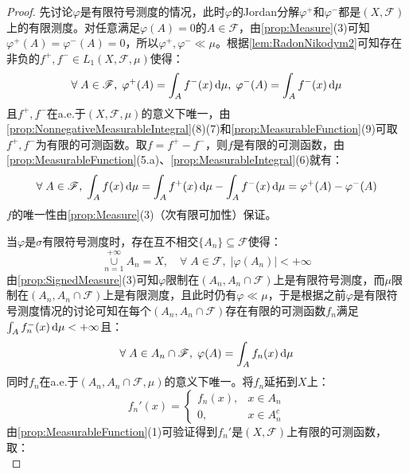 \begin{proof}
	先讨论$\varphi$是有限符号测度的情况，此时$\varphi$的Jordan分解$\varphi^+$和$\varphi^-$都是$(X,\mathscr{F})$上的有限测度。对任意满足$\varphi(A)=0$的$A\in\mathscr{F}$，由\cref{prop:Measure}(3)可知$\varphi^+(A)=\varphi^-(A)=0$，所以$\varphi^+,\varphi^-\ll\mu$。根据\cref{lem:RadonNikodym2}可知存在非负的$f^+,f^-\in L_1(X,\mathscr{F},\mu)$使得：
	\begin{equation*}
		\forall\;A\in\mathscr{F},\;\varphi^+(A)=\int_{A}f^-(x)\mathop{}\!\mathrm{d}\mu,\;\varphi^-(A)=\int_{A}f^-(x)\mathop{}\!\mathrm{d}\mu
	\end{equation*}
	且$f^+,f^-$在a.e.于$(X,\mathscr{F},\mu)$的意义下唯一，由\cref{prop:NonnegativeMeasurableIntegral}(8)(7)和\cref{prop:MeasurableFunction}(9)可取$f^+,f^-$为有限的可测函数。取$f=f^+-f^-$，则$f$是有限的可测函数，由\cref{prop:MeasurableFunction}(5.a)、\cref{prop:MeasurableIntegral}(6)就有：
	\begin{equation*}
		\forall\;A\in\mathscr{F},\;\int_{A}f(x)\mathop{}\!\mathrm{d}\mu=\int_{A}f^+(x)\mathop{}\!\mathrm{d}\mu-\int_{A}f^-(x)\mathop{}\!\mathrm{d}\mu=\varphi^+(A)-\varphi^-(A)
	\end{equation*}
	$f$的唯一性由\cref{prop:Measure}(3)（次有限可加性）保证。\par
	当$\varphi$是$\sigma$有限符号测度时，存在互不相交$\{A_n\}\subseteq\mathscr{F}$使得：
	\begin{equation*}
		\underset{n=1}{\overset{+\infty}{\cup}}A_n=X,\quad\forall\;A\in\mathscr{F},\;|\varphi(A_n)|<+\infty
	\end{equation*}
	由\cref{prop:SignedMeasure}(3)可知$\varphi$限制在$(A_n,A_n\cap\mathscr{F})$上是有限符号测度，而$\mu$限制在$(A_n,A_n\cap\mathscr{F})$上是有限测度，且此时仍有$\varphi\ll\mu$，于是根据之前$\varphi$是有限符号测度情况的讨论可知在每个$(A_n,A_n\cap\mathscr{F})$存在有限的可测函数$f_n$满足$\int_{A}f_n^-(x)\mathop{}\!\mathrm{d}\mu<+\infty$且：
	\begin{equation*}
		\forall\;A\in A_n\cap\mathscr{F},\;\varphi(A)=\int_{A}f_n(x)\mathop{}\!\mathrm{d}\mu
	\end{equation*}
	同时$f_n$在a.e.于$(A_n,A_n\cap\mathscr{F},\mu)$的意义下唯一。将$f_n$延拓到$X$上：
	\begin{equation*}
		f_n'(x)=
		\begin{cases}
			f_n(x),&x\in A_n \\
			0,&x\in A_n^c
		\end{cases}
	\end{equation*}
	由\cref{prop:MeasurableFunction}(1)可验证得到$f_n'$是$(X,\mathscr{F})$上有限的可测函数，取：
	\begin{equation*}

\end{equation*}
\end{proof}
